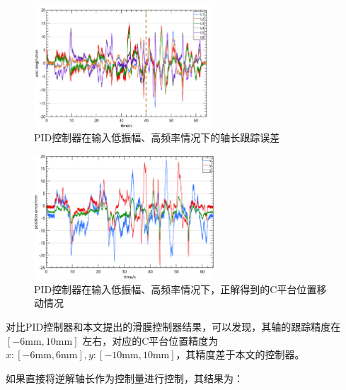 \begin{figure}[H]
    \centering
    \includegraphics[width=0.6\textwidth]{imgs/Experiment/P-AH-FL_1_axis_diff_length.png}
    \caption{PID控制器在输入低振幅、高频率情况下的轴长跟踪误差}
    \label{fig:P-AH-FL_1_axis_diff_length}
\end{figure}

\begin{figure}[H]
    \centering
    \includegraphics[width=0.6\textwidth]{imgs/Experiment/P-AH-FL_1_c_movement.png}
    \caption{PID控制器在输入低振幅、高频率情况下，正解得到的C平台位置移动情况}
    \label{fig:P-AH-FL_1_c_movement}
\end{figure}

对比PID控制器和本文提出的滑膜控制器结果，可以发现，其轴的跟踪精度在$\left[ -6\mathrm{mm},10\mathrm{mm} \right] $
左右，对应的C平台位置精度为$x:\left[ -6\mathrm{mm},6\mathrm{mm} \right] ,y:\left[ -10\mathrm{mm},10\mathrm{mm} \right] $，其精度差于本文的控制器。

如果直接将逆解轴长作为控制量进行控制，其结果为：

